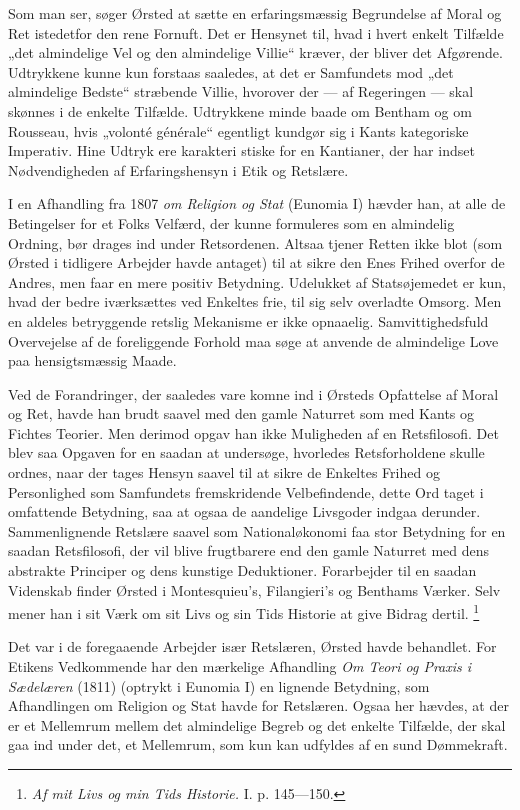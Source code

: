 \documentclass[12pt,a4paper,openany]{book}
\newcommand{\opage}[1]{\marginnote{\footnotesize\textit{[#1]}}}
\begin{document}
Som man ser, søger Ørsted at sætte en erfaringsmæssig Begrundelse af Moral og
Ret istedetfor den rene Fornuft. Det er Hensynet til, hvad i hvert enkelt
Tilfælde „det almindelige Vel og den almindelige Villie“ kræver, der bliver det
Afgørende. Udtrykkene kunne kun forstaas saaledes, at det er Samfundets mod
„det almindelige Bedste“ stræbende Villie, hvorover der --- af Regeringen ---
skal skønnes i de enkelte Tilfælde. Udtrykkene minde baade om Bentham og om
Rousseau, hvis „volonté générale“ egentligt kundgør sig i Kants kategoriske
Imperativ. Hine Udtryk ere karakteri%
\setcounter{footnote}{0}%
\opage{77}stiske for en Kantianer, der har indset Nødvendigheden af
Erfaringshensyn i Etik og Retslære.

I en Afhandling fra 1807 \textit{om Religion og Stat} (Eunomia I) hævder han,
at alle de Betingelser for et Folks Velfærd, der kunne formuleres som en
almindelig Ordning, bør drages ind under Retsordenen. Altsaa tjener Retten ikke
blot (som Ørsted i tidligere Arbejder havde antaget) til at sikre den Enes
Frihed overfor de Andres, men faar en mere positiv Betydning. Udelukket af
Statsøjemedet er kun, hvad der bedre iværksættes ved Enkeltes frie, til sig
selv overladte Omsorg. Men en aldeles betryggende retslig Mekanisme er ikke
opnaaelig. Samvittighedsfuld Overvejelse af de foreliggende Forhold maa søge at
anvende de almindelige Love paa hensigtsmæssig Maade.

Ved de Forandringer, der saaledes vare komne ind i Ørsteds Opfattelse af Moral
og Ret, havde han brudt saavel med den gamle Naturret som med Kants og Fichtes
Teorier. Men derimod opgav han ikke Muligheden af en Retsfilosofi. Det blev saa
Opgaven for en saadan at undersøge, hvorledes Retsforholdene skulle ordnes,
naar der tages Hensyn saavel til at sikre de Enkeltes Frihed og Personlighed
som Samfundets fremskridende Velbefindende, dette Ord taget i omfattende
Betydning, saa at ogsaa de aandelige Livsgoder indgaa derunder. Sammenlignende
Retslære saavel som Nationaløkonomi faa stor Betydning for en saadan
Retsfilosofi, der vil blive frugtbarere end den gamle Naturret med dens
abstrakte Principer og dens kunstige Deduktioner. Forarbejder til en saadan
Videnskab finder Ørsted i Montesquieu's, Filangieri's og Benthams Værker. Selv
mener han i sit Værk om sit Livs og sin Tids Historie at give Bidrag dertil.%
\footnote[1]{\textit{Af mit Livs og min Tids Historie.} I. p. 145---150.}

Det var i de foregaaende Arbejder især Retslæren, Ørsted havde behandlet. For
Etikens Vedkommende har den mærkelige Afhandling \textit{Om Teori og Praxis i
Sædelæren} (1811) (optrykt i Eunomia I) en lignende Betydning, som Afhandlingen
om Religion og Stat havde for Retslæren. Ogsaa her hævdes,
\setcounter{footnote}{0}%
\opage{78}at der er et Mellemrum mellem det almindelige Begreb og det enkelte
Tilfælde, der skal gaa ind under det, et Mellemrum, som kun kan udfyldes af en
sund Dømmekraft.
\end{document}
